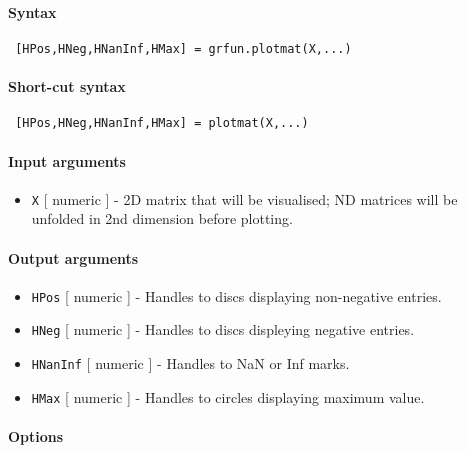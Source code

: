


	\paragraph{Syntax}
 
 \begin{verbatim}
 [HPos,HNeg,HNanInf,HMax] = grfun.plotmat(X,...)
 \end{verbatim}
 
 \paragraph{Short-cut syntax}
 
 \begin{verbatim}
 [HPos,HNeg,HNanInf,HMax] = plotmat(X,...)
 \end{verbatim}
 
 \paragraph{Input arguments}
 
 \begin{itemize}
 \item
   \texttt{X} {[} numeric {]} - 2D matrix that will be visualised; ND
   matrices will be unfolded in 2nd dimension before plotting.
 \end{itemize}
 
 \paragraph{Output arguments}
 
 \begin{itemize}
 \item
   \texttt{HPos} {[} numeric {]} - Handles to discs displaying
   non-negative entries.
 \item
   \texttt{HNeg} {[} numeric {]} - Handles to discs displeying negative
   entries.
 \item
   \texttt{HNanInf} {[} numeric {]} - Handles to NaN or Inf marks.
 \item
   \texttt{HMax} {[} numeric {]} - Handles to circles displaying maximum
   value.
 \end{itemize}
 
 \paragraph{Options}
 
